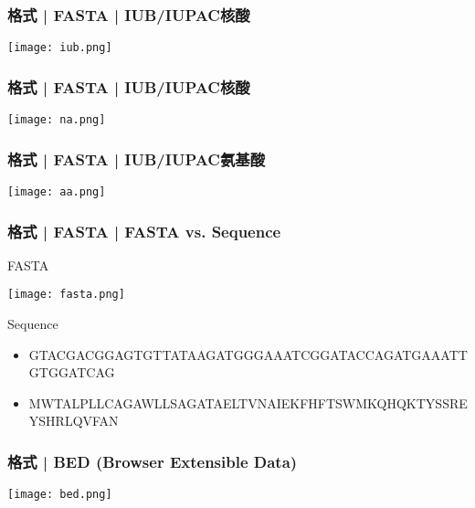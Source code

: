 \begin{frame}
  \frametitle{格式 | FASTA | IUB/IUPAC核酸}
    \begin{center}
      \texttt{[image: iub.png]}
    \end{center}
\end{frame}

\begin{frame}
  \frametitle{格式 | FASTA | IUB/IUPAC核酸}
    \begin{center}
      \texttt{[image: na.png]}
    \end{center}
\end{frame}

\begin{frame}
  \frametitle{格式 | FASTA | IUB/IUPAC氨基酸}
    \begin{center}
      \texttt{[image: aa.png]}
    \end{center}
\end{frame}

\begin{frame}
  \frametitle{格式 | FASTA | FASTA vs. Sequence}
  \begin{block}{FASTA}
    \begin{center}
      \texttt{[image: fasta.png]}
    \end{center}
  \end{block}
  \begin{block}{Sequence}
    \begin{itemize}
      \item {\scriptsize GTACGACGGAGTGTTATAAGATGGGAAATCGGATACCAGATGAAATTGTGGATCAG}
      \item {\scriptsize MWTALPLLCAGAWLLSAGATAELTVNAIEKFHFTSWMKQHQKTYSSREYSHRLQVFAN}
    \end{itemize}
  \end{block}
\end{frame}

\begin{frame}
  \frametitle{格式 | BED (Browser Extensible Data)}
    \begin{center}
      \texttt{[image: bed.png]}
    \end{center}
\end{frame}

